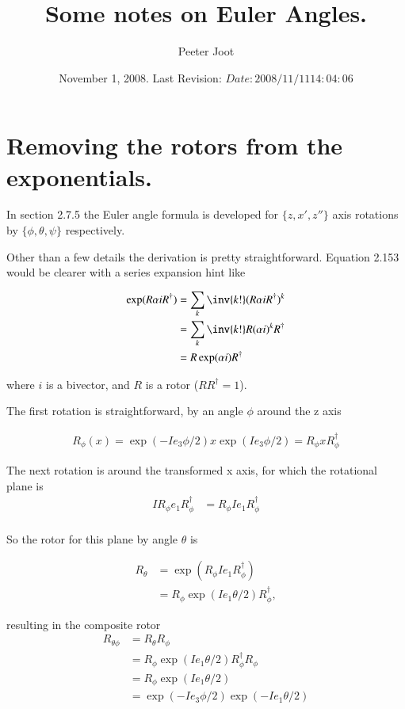 \documentclass{article}
\title{Some notes on Euler Angles.}
\author{Peeter Joot}
\date{ November 1, 2008. Last Revision: $Date: 2008/11/11 14:04:06 $ }
\begin{document}
\maketitle{}
\tableofcontents

\section{ Removing the rotors from the exponentials. }

In \cite{doran2003gap} section 2.7.5 the Euler angle formula is 
developed for $\{z,x',z''\}$ axis rotations by $\{\phi, \theta, \psi\}$
respectively.

Other than a few details the derivation is pretty straightforward.  Equation
2.153 would be clearer with a series expansion hint like

\begin{align*}
\exp(R \alpha i R^\dagger) 
&= \sum_k \inv{k!} (R \alpha i R^\dagger)^k \\
&= \sum_k \inv{k!} R (\alpha i)^k R^\dagger \\
&= R \exp(\alpha i) R^\dagger
\end{align*}

where $i$ is a bivector, and $R$ is a rotor ($RR^\dagger = 1$).

The first rotation is straightforward, by an angle $\phi$ around the z axis

\begin{align*}
R_\phi(x) = \exp(-Ie_3 \phi/2) x \exp(Ie_3 \phi/2) = R_\phi x R_\phi^\dagger
\end{align*}

The next rotation is around the transformed x axis, for which the rotational plane is
\begin{align*}
I R_\phi e_1 R_\phi^\dagger 
&= R_\phi I e_1 R_\phi^\dagger  \\
\end{align*}

So the rotor for this plane by angle $\theta$ is

\begin{align*}
R_\theta 
&= \exp( R_\phi I e_1 R_\phi^\dagger ) \\
&= R_\phi \exp( I e_1 \theta/2) R_\phi^\dagger,
\end{align*}

resulting in the composite rotor
\begin{align*}
R_{\theta\phi}
&=
R_\theta 
R_\phi \\
&= R_\phi \exp( I e_1 \theta/2) R_\phi^\dagger R_\phi \\
&= R_\phi \exp( I e_1 \theta/2) \\
&= 
\exp{( -I e_3 \phi/2 )}
\exp( -I e_1 \theta/2 ) \\
\end{align*}
\end{document}
